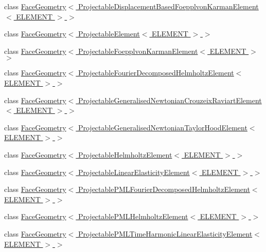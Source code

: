 \begin{DoxyCompactItemize}
class \hyperlink{classoomph_1_1FaceGeometry_3_01ProjectableDisplacementBasedFoepplvonKarmanElement_3_01ELEMENT_01_4_01_4}{Face\+Geometry$<$ Projectable\+Displacement\+Based\+Foepplvon\+Karman\+Element$<$ E\+L\+E\+M\+E\+N\+T $>$ $>$}
\item 
class \hyperlink{classoomph_1_1FaceGeometry_3_01ProjectableElement_3_01ELEMENT_01_4_01_4}{Face\+Geometry$<$ Projectable\+Element$<$ E\+L\+E\+M\+E\+N\+T $>$ $>$}
\item 
class \hyperlink{classoomph_1_1FaceGeometry_3_01ProjectableFoepplvonKarmanElement_3_01ELEMENT_01_4_01_4}{Face\+Geometry$<$ Projectable\+Foepplvon\+Karman\+Element$<$ E\+L\+E\+M\+E\+N\+T $>$ $>$}
\item 
class \hyperlink{classoomph_1_1FaceGeometry_3_01ProjectableFourierDecomposedHelmholtzElement_3_01ELEMENT_01_4_01_4}{Face\+Geometry$<$ Projectable\+Fourier\+Decomposed\+Helmholtz\+Element$<$ E\+L\+E\+M\+E\+N\+T $>$ $>$}
\item 
class \hyperlink{classoomph_1_1FaceGeometry_3_01ProjectableGeneralisedNewtonianCrouzeixRaviartElement_3_01ELEMENT_01_4_01_4}{Face\+Geometry$<$ Projectable\+Generalised\+Newtonian\+Crouzeix\+Raviart\+Element$<$ E\+L\+E\+M\+E\+N\+T $>$ $>$}
\item 
class \hyperlink{classoomph_1_1FaceGeometry_3_01ProjectableGeneralisedNewtonianTaylorHoodElement_3_01ELEMENT_01_4_01_4}{Face\+Geometry$<$ Projectable\+Generalised\+Newtonian\+Taylor\+Hood\+Element$<$ E\+L\+E\+M\+E\+N\+T $>$ $>$}
\item 
class \hyperlink{classoomph_1_1FaceGeometry_3_01ProjectableHelmholtzElement_3_01ELEMENT_01_4_01_4}{Face\+Geometry$<$ Projectable\+Helmholtz\+Element$<$ E\+L\+E\+M\+E\+N\+T $>$ $>$}
\item 
class \hyperlink{classoomph_1_1FaceGeometry_3_01ProjectableLinearElasticityElement_3_01ELEMENT_01_4_01_4}{Face\+Geometry$<$ Projectable\+Linear\+Elasticity\+Element$<$ E\+L\+E\+M\+E\+N\+T $>$ $>$}
\item 
class \hyperlink{classoomph_1_1FaceGeometry_3_01ProjectablePMLFourierDecomposedHelmholtzElement_3_01ELEMENT_01_4_01_4}{Face\+Geometry$<$ Projectable\+P\+M\+L\+Fourier\+Decomposed\+Helmholtz\+Element$<$ E\+L\+E\+M\+E\+N\+T $>$ $>$}
\item 
class \hyperlink{classoomph_1_1FaceGeometry_3_01ProjectablePMLHelmholtzElement_3_01ELEMENT_01_4_01_4}{Face\+Geometry$<$ Projectable\+P\+M\+L\+Helmholtz\+Element$<$ E\+L\+E\+M\+E\+N\+T $>$ $>$}
\item 
class \hyperlink{classoomph_1_1FaceGeometry_3_01ProjectablePMLTimeHarmonicLinearElasticityElement_3_01ELEMENT_01_4_01_4}{Face\+Geometry$<$ Projectable\+P\+M\+L\+Time\+Harmonic\+Linear\+Elasticity\+Element$<$ E\+L\+E\+M\+E\+N\+T $>$ $>$}

\end{DoxyCompactItemize}
